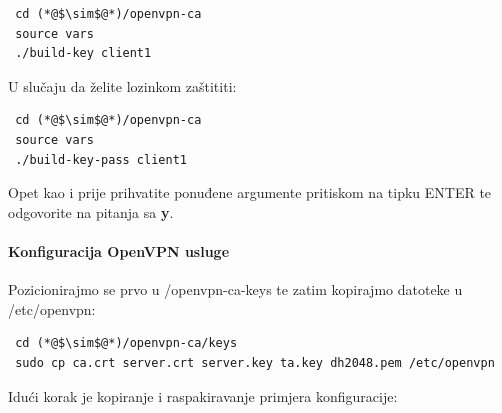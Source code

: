\begin{lstlisting}
 cd (*@$\sim$@*)/openvpn-ca
 source vars
 ./build-key client1
\end{lstlisting}
U slučaju da želite lozinkom zaštititi:  
\begin{lstlisting}
 cd (*@$\sim$@*)/openvpn-ca
 source vars
 ./build-key-pass client1
\end{lstlisting}
Opet kao i prije prihvatite ponuđene argumente pritiskom na tipku ENTER te odgovorite na pitanja sa \textbf{y}.
\bigbreak
\paragraph*{Konfiguracija OpenVPN usluge}
\hfill \smallbreak
Pozicionirajmo se prvo u /openvpn-ca-keys te zatim kopirajmo datoteke u /etc/openvpn:
\begin{lstlisting}
 cd (*@$\sim$@*)/openvpn-ca/keys
 sudo cp ca.crt server.crt server.key ta.key dh2048.pem /etc/openvpn
\end{lstlisting}
Idući korak je kopiranje i raspakiravanje primjera konfiguracije:

